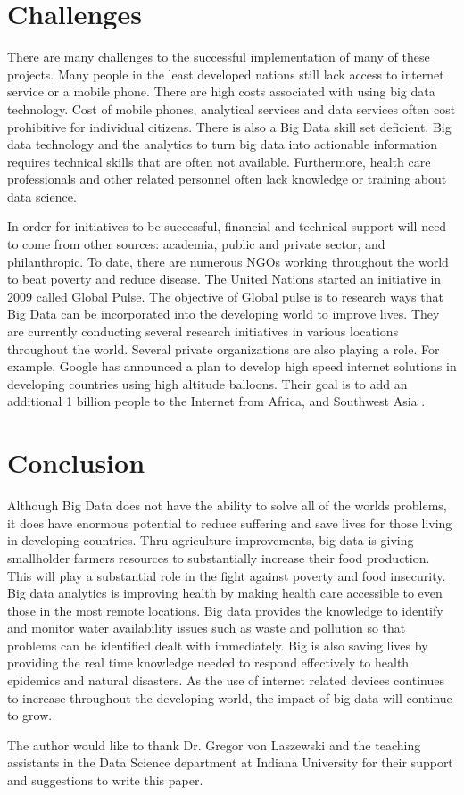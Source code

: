 \documentclass[sigconf]{acmart}
\begin{document}
\section{Challenges}
There are many challenges to the successful implementation of many of these projects.  Many people in the least developed nations still lack access to internet service or a mobile phone. There are high costs associated with using big data technology. Cost of mobile phones, analytical services and data services often cost prohibitive for individual citizens. There is also a Big Data skill set deficient. Big data technology and the analytics to turn big data into actionable information requires technical skills that are often not available. Furthermore, health care professionals and other related personnel often lack knowledge or training about data science. 

In order for initiatives to be successful, financial and technical support will need to come from other sources: academia, public and private sector, and philanthropic. To date, there are numerous NGOs working throughout the world to beat poverty and reduce disease. The United Nations started an initiative in 2009 called Global Pulse. The objective of Global pulse is to research ways that Big Data can be incorporated into the developing world to improve lives. They are currently conducting several research initiatives in various locations throughout the world. Several private organizations are also playing a role. For example, Google has announced a plan to develop high speed internet solutions in developing countries using high altitude balloons. Their goal is to add an additional 1 billion people to the Internet from Africa, and Southwest Asia \cite{DevEcon}. 

\section{Conclusion}

Although Big Data does not have the ability to solve all of the worlds problems, it does have enormous potential to reduce suffering and save lives for those living in developing countries. Thru agriculture improvements, big data is giving smallholder farmers resources to substantially increase their food production. This will play a substantial role in the fight against poverty and food insecurity. Big data analytics is improving health by making health care accessible to even those in the most remote locations. Big data provides the knowledge to identify and monitor water availability issues such as waste and pollution so that problems can be identified dealt with immediately. Big is also saving lives by providing the real time knowledge needed to respond effectively to health epidemics and natural disasters. As the use of internet related devices continues to increase throughout the developing world, the impact of big data will continue to grow.   







\begin{acks}

  The author would like to thank Dr. Gregor von Laszewski and the teaching assistants in the Data Science department at Indiana University for their support and suggestions to write this paper.

\end{acks}




 
\end{document}
